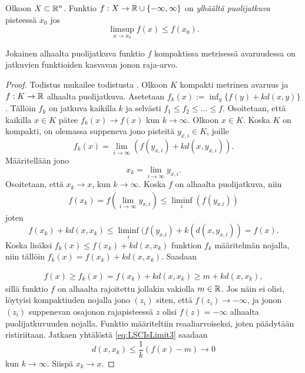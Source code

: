 \documentclass[12pt,oneside,a4paper]{amsbook} %
\begin{document}
\begin{definition}
    Olkoon $X\subset \mathbb{R}^n$. Funktio $f: X \to \mathbb{R} \cup\{-\infty, \infty\}$ on \textit{ylhäältä puolijatkuva} pisteessä $x_0$ jos 
    $$\limsup_{x\to x_0}  f(x) \le f(x_0).$$
\end{definition}

\begin{lemma}\label{le:LSCisLimitOfC-Functions}
    Jokainen alhaalta puolijatkuva funktio $f$ kompaktissa metrisessä avaruudessa on jatkuvien funktioiden kasvavan jonon raja-arvo.
\end{lemma}
\begin{proof}
    Todistus mukailee todistusta \cite[s. 30]{optimal}. Olkoon $K$ kompakti metrinen avaruus ja $f:K \to \mathbb{R}$ alhaalta puolijatkuva. Asetetaan $f_k(x) := \inf_y\{f(y) + kd(x,y)\}$. Tällöin $f_k$ on jatkuva kaikilla $k$ ja selvästi $f_1 \le f_2 \le ... \le f$. Osoitetaan, että kaikilla $x\in K$ pätee $f_k(x) \to f(x)$ kun $k \to \infty$. 
    Olkoon $x\in K$. Koska $K$ on kompakti, on olemassa suppeneva jono pisteitä $y_{x,i} \in K$, joille
    \begin{equation*}
        f_k(x) = \lim_{i \to \infty}(f(y_{x,i}) + k d(x, y_{x,i})).
    \end{equation*}
    Määritellään jono 
    \begin{equation*}
        x_k = \lim_{i\to \infty} y_{x,i}.
    \end{equation*}
    Osoitetaan, että $x_k \to x$, kun $k \to \infty$. Koska $f$ on alhaalta puolijatkuva, niin 
    \begin{align*}
        f(x_k) = f(\lim_{i\to \infty} y_{x,i}) \le \liminf_i (f(y_{x.i}))
    \end{align*}
    joten 
    \begin{equation*}
        f(x_k) + k d(x, x_k) \le \liminf_i (f(y_{x.i}) + k(d(x,y_{x,i})) = f(x).
    \end{equation*}
    Koska lisäksi $f_k(x) \le f(x_k) + kd(x, x_k)$ funktion $f_k$ määritelmän nojalla, niin tällöin $f_k(x) = f(x_k) + kd(x,x_k)$. Saadaan
    
    \begin{align}\label{eq:LSCIsLimit3}
        f(x) \ge f_k(x) = f(x_k) + kd(x, x_k) \ge m + k d(x, x_k),
    \end{align}
    sillä funktio $f$ on alhaalta rajoitettu jollakin vakiolla $m \in \mathbb{R}$. Jos näin ei olisi, löytyisi kompaktiuden nojalla jono $(z_i)$ siten, että $f(z_i) \to -\infty$, ja jonon $(z_i)$ suppenevan osajonon rajapisteessä $z$ olisi $f(z) = -\infty$ alhaalta puolijatkuvuuden nojalla. Funktio määriteltiin reaaliarvoiseksi, joten päädytään ristiriitaan. Jatkaen yhtälöstä \eqref{eq:LSCIsLimit3} saadaan 
    \begin{equation*}%
        d(x, x_k) \le \frac{1}{k}(f(x) - m) \to 0
    \end{equation*}
    kun $k \to \infty$. Siispä $x_k \to x$.
    

\end{proof}
\end{document}
